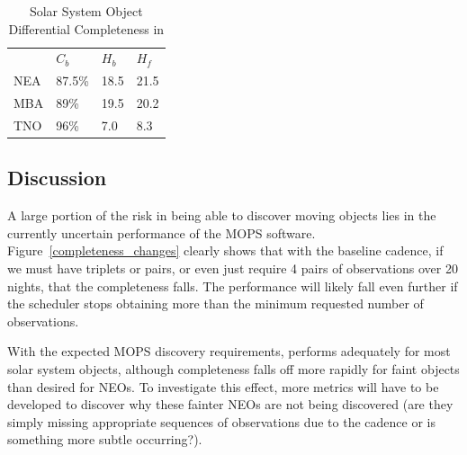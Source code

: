 \begin{table}[]
\centering
\caption{Solar System Object Differential Completeness in }
\label{ssoperf}
\begin{tabular}{llll}
    & $C_b$ & $H_b$ & $H_f$ \\
NEA & 87.5\%  & 18.5  & 21.5  \\
MBA & 89\%  & 19.5  & 20.2  \\
TNO & 96\%  & 7.0   & 8.3
\end{tabular}
\end{table}




\subsection{Discussion}
\label{sec:\secname:discussion}

A large portion of the risk in being able to discover moving objects
lies in the currently uncertain performance of the MOPS
software. Figure~\ref{completeness_changes} clearly shows that with
the baseline cadence, if we must have triplets or pairs, or even just
require 4 pairs of observations over 20 nights, that the completeness
falls. The performance will likely fall even further if the scheduler
stops obtaining more than the minimum requested number of observations.

With the expected MOPS discovery requirements,
 performs adequately for most solar system
objects, although completeness falls off more rapidly for faint
objects than desired for NEOs. To investigate this effect, more
metrics will have to be developed to discover why these fainter NEOs
are not being discovered (are they simply missing appropriate
sequences of observations due to the cadence or is something more
subtle occurring?).

